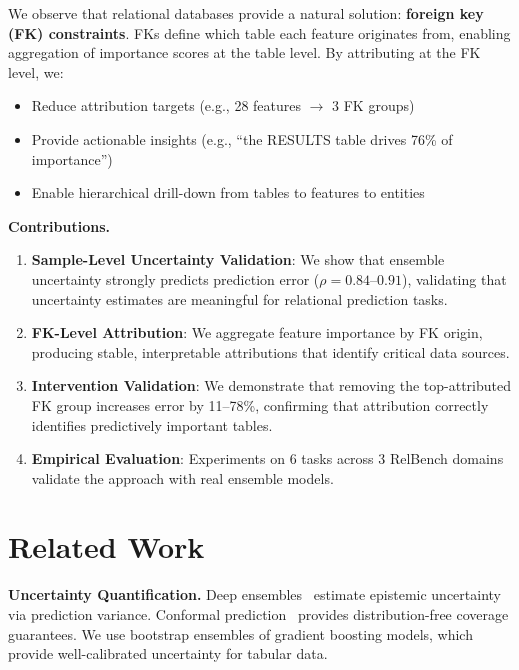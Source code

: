 \documentclass{article}
\begin{document}
We observe that relational databases provide a natural solution: \textbf{foreign key (FK)
constraints}. FKs define which table each feature originates from, enabling aggregation
of importance scores at the table level. By attributing at the FK level, we:
\begin{itemize}
    \item Reduce attribution targets (e.g., 28 features $\to$ 3 FK groups)
    \item Provide actionable insights (e.g., ``the RESULTS table drives 76\% of importance'')
    \item Enable hierarchical drill-down from tables to features to entities
\end{itemize}

\textbf{Contributions.}
\begin{enumerate}
    \item \textbf{Sample-Level Uncertainty Validation}: We show that ensemble uncertainty
    strongly predicts prediction error ($\rho = 0.84$--$0.91$), validating that
    uncertainty estimates are meaningful for relational prediction tasks.

    \item \textbf{FK-Level Attribution}: We aggregate feature importance by FK origin,
    producing stable, interpretable attributions that identify critical data sources.

    \item \textbf{Intervention Validation}: We demonstrate that removing the
    top-attributed FK group increases error by 11--78\%, confirming that attribution
    correctly identifies predictively important tables.

    \item \textbf{Empirical Evaluation}: Experiments on 6 tasks across 3 RelBench domains
    validate the approach with real ensemble models.
\end{enumerate}

\section{Related Work}
\label{sec:related}

\textbf{Uncertainty Quantification.}
Deep ensembles~\citep{lakshminarayanan2017simple} estimate epistemic uncertainty via
prediction variance. Conformal prediction~\citep{vovk2005algorithmic} provides
distribution-free coverage guarantees. We use bootstrap ensembles of gradient boosting
models, which provide well-calibrated uncertainty for tabular data.
\end{document}
